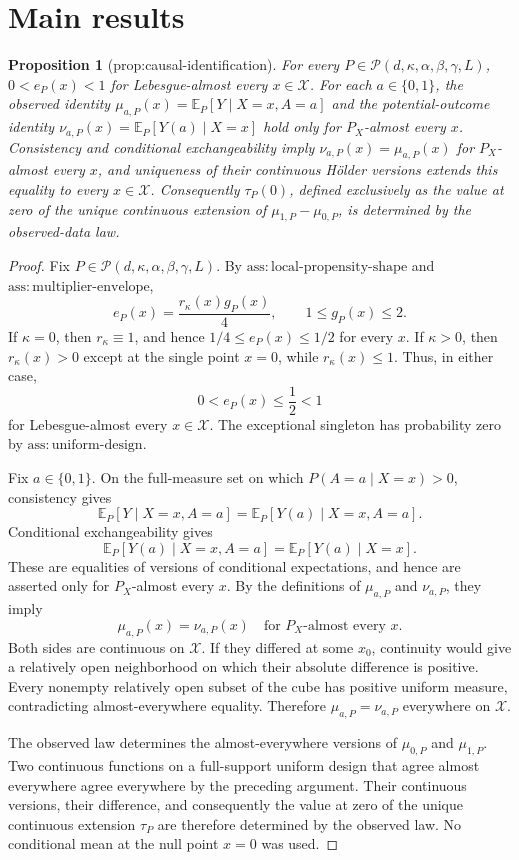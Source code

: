 \documentclass{article}
\newtheorem{proposition}{Proposition}
\begin{document}
\section{Main results}

\begin{proposition}[prop:causal-identification]\label{prop:causal-identification}
For every \(P\in\mathcal P(d,\kappa,\alpha,\beta,\gamma,L)\), \(0<e_P(x)<1\) for Lebesgue-almost every \(x\in\mathcal X\). For each \(a\in\{0,1\}\), the observed identity \(\mu_{a,P}(x)=\mathbb E_P[Y\mid X=x,A=a]\) and the potential-outcome identity \(\nu_{a,P}(x)=\mathbb E_P[Y(a)\mid X=x]\) hold only for \(P_X\)-almost every \(x\). Consistency and conditional exchangeability imply \(\nu_{a,P}(x)=\mu_{a,P}(x)\) for \(P_X\)-almost every \(x\), and uniqueness of their continuous H\"older versions extends this equality to every \(x\in\mathcal X\). Consequently \(\tau_P(0)\), defined exclusively as the value at zero of the unique continuous extension of \(\mu_{1,P}-\mu_{0,P}\), is determined by the observed-data law.
\end{proposition}
\begin{proof}
Fix \(P\in\mathcal P(d,\kappa,\alpha,\beta,\gamma,L)\).  By \(\mathrm{ass:local\mbox{-}propensity\mbox{-}shape}\) and \(\mathrm{ass:multiplier\mbox{-}envelope}\),
\[
 e_P(x)=\frac{r_\kappa(x)g_P(x)}4,
 \qquad 1\le g_P(x)\le2.
\]
If \(\kappa=0\), then \(r_\kappa\equiv1\), and hence \(1/4\le e_P(x)\le1/2\) for every \(x\).  If \(\kappa>0\), then \(r_\kappa(x)>0\) except at the single point \(x=0\), while \(r_\kappa(x)\le1\).  Thus, in either case,
\[
 0<e_P(x)\le\frac12<1
\]
for Lebesgue-almost every \(x\in\mathcal X\).  The exceptional singleton has probability zero by \(\mathrm{ass:uniform\mbox{-}design}\).

Fix \(a\in\{0,1\}\).  On the full-measure set on which \(P(A=a\mid X=x)>0\), consistency gives
\[
 \mathbb E_P[Y\mid X=x,A=a]
 =\mathbb E_P[Y(a)\mid X=x,A=a].
\]
Conditional exchangeability gives
\[
 \mathbb E_P[Y(a)\mid X=x,A=a]
 =\mathbb E_P[Y(a)\mid X=x].
\]
These are equalities of versions of conditional expectations, and hence are asserted only for \(P_X\)-almost every \(x\).  By the definitions of \(\mu_{a,P}\) and \(\nu_{a,P}\), they imply
\[
 \mu_{a,P}(x)=\nu_{a,P}(x)
 \quad\text{for }P_X\text{-almost every }x.
\]
Both sides are continuous on \(\mathcal X\).  If they differed at some \(x_0\), continuity would give a relatively open neighborhood on which their absolute difference is positive.  Every nonempty relatively open subset of the cube has positive uniform measure, contradicting almost-everywhere equality.  Therefore \(\mu_{a,P}=\nu_{a,P}\) everywhere on \(\mathcal X\).

The observed law determines the almost-everywhere versions of \(\mu_{0,P}\) and \(\mu_{1,P}\).  Two continuous functions on a full-support uniform design that agree almost everywhere agree everywhere by the preceding argument.  Their continuous versions, their difference, and consequently the value at zero of the unique continuous extension \(\tau_P\) are therefore determined by the observed law.  No conditional mean at the null point \(x=0\) was used.
\end{proof}
\end{document}
